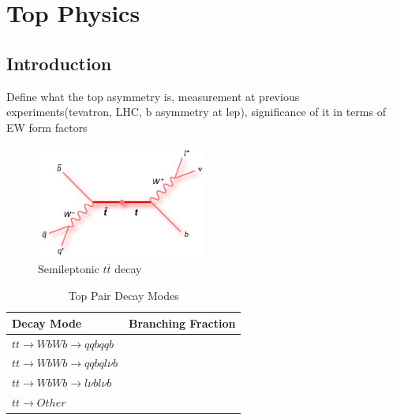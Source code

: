 \chapter{Top Physics}
\label{chapter:topanalysis}
\section{Introduction}
Define what the top asymmetry is, measurement at previous experiments(tevatron, LHC, b asymmetry at lep), significance of it in terms of EW form factors


\begin{figure}
  \centering
  \includegraphics[width=0.5\textwidth]{TopAnalysis/figures/TopFeynmann.jpg}
  \caption[Semileptonic $t\bar{t}$ decay]{Semileptonic $t\bar{t}$ decay}
  \label{fig:topfeynmann}
\end{figure}

\begin{table}
  \centering
  \begin{tabular}{l |p{120mm}}
    \toprule
    Decay Mode     & Branching Fraction  \\
    \midrule
    $tt\rightarrow WbWb\rightarrow qqbqqb$ & \\
    \midrule
    $tt\rightarrow WbWb\rightarrow qqbql\nu b$ & \\
    \midrule
    $tt\rightarrow WbWb\rightarrow l\nu bl\nu b$ & \\
    \midrule
    $tt\rightarrow Other$ & \\
    \bottomrule
  \end{tabular}
  \caption{Top Pair Decay Modes}
  \label{table:topdecaymodes}
\end{table}



